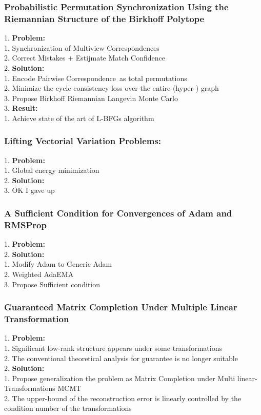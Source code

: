 \subsubsection{Probabilistic Permutation Synchronization Using the Riemannian Structure of the Birkhoff Polytope}
    1. {\bf Problem:} \\
        1. Synchronization of Multiview Correspondences \\
        2. Correct Mistakes + Estijmate Match Confidence \\
    2. {\bf Solution:} \\
        1. Encode Pairwise Correspondence\ as total permutations \\
        2. Minimize the cycle consistency loss over the entire (hyper-) graph \\
        3. Propose Birkhoff Riemannian Langevin Monte Carlo \\
    3. {\bf Result:} \\
        1. Achieve state of the art of L-BFGs algorithm \\
\subsubsection{Lifting Vectorial Variation Problems:}
    1. {\bf Problem:} \\
        1. Global energy minimization \\
    2. {\bf Solution:} \\
    3. OK I gave up \\
\subsubsection{A Sufficient Condition for Convergences of Adam and RMSProp}
    1. {\bf Problem:} \\
    2. {\bf Solution:} \\
        1. Modify Adam to Generic Adam \\
        2. Weighted AdaEMA \\
        3. Propose Sufficient condition \\
\subsubsection{Guaranteed Matrix Completion Under Multiple Linear Transformation}
    1. {\bf Problem:} \\
        1. Significant low-rank structure appears under some transformations \\
        2. The conventional theoretical analysis for guarantee is no longer suitable \\
    2. {\bf Solution:} \\
        1. Propose generalization the problem as Matrix Completion under Multi linear-Transformations MCMT \\
        2. The upper-bound of the reconstruction error is linearly controlled by the condition number of the transformations \\
